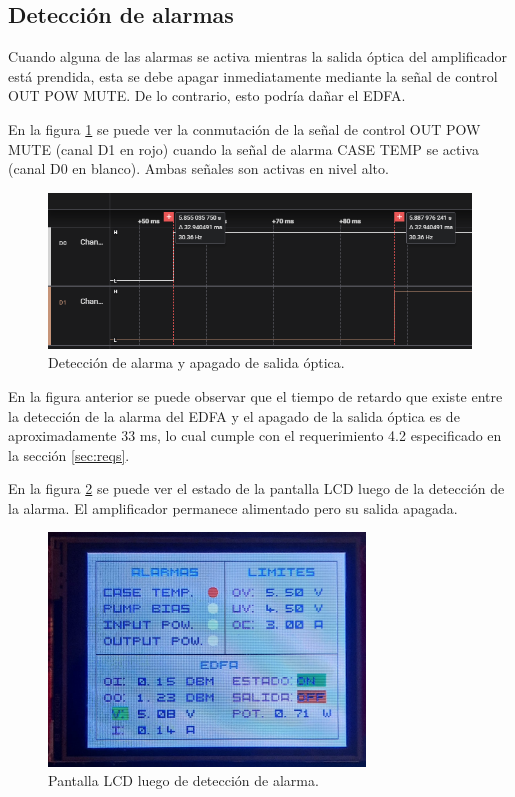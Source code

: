 \subsection{Detección de alarmas}

Cuando alguna de las alarmas se activa mientras la salida óptica del amplificador está prendida, esta se debe apagar inmediatamente mediante la señal de control OUT POW MUTE. De lo contrario, esto podría dañar el EDFA.

En la figura \ref{fig:detecAlarm2} se puede ver la conmutación de la señal de control OUT POW MUTE (canal D1 en rojo) cuando la señal de alarma CASE TEMP se activa (canal D0 en blanco). Ambas señales son activas en nivel alto.

\begin{figure}[H]
\centering
\includegraphics[width=1\textwidth]{./Figures/detecAlarm2.png}
\caption{Detección de alarma y apagado de salida óptica.}
\label{fig:detecAlarm2}
\end{figure}

En la figura anterior se puede observar que el tiempo de retardo que existe entre la detección de la alarma del EDFA y el apagado de la salida óptica es de aproximadamente 33 ms, lo cual cumple con el requerimiento 4.2 especificado en la sección \ref{sec:reqs}.

En la figura \ref{fig:detecAlarm} se puede ver el estado de la pantalla LCD luego de la detección de la alarma. El amplificador permanece alimentado pero su salida apagada.

\begin{figure}[H]
\centering
\includegraphics[width=0.75\textwidth]{./Figures/detecAlarm.jpg}
\caption{Pantalla LCD luego de detección de alarma.}
\label{fig:detecAlarm}
\end{figure}

